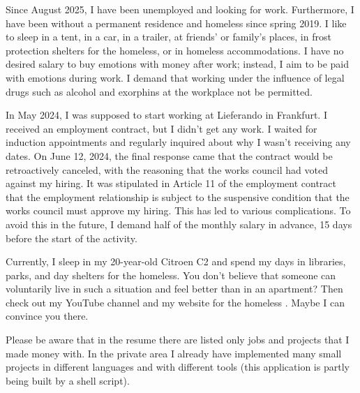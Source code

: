 \documentclass[fromphone,parskip=half]{scrlttr2}%
\newcommand\versionLanguageStart{}
\newcommand\versionLanguageEnd{}
\begin{document}
	\begin{letter}%
	{
		\addressReceiver
	}
		\opening{\joinList{\dear}{\genderReceiver}{\surnameReceiver}{,}}
\versionLanguageStart%
		Since August 2025, I have been unemployed and looking for work.
		Furthermore, I have been without a permanent residence and homeless since spring 2019.
		I like to sleep in a tent, in a car, in a trailer, at friends' or family's places, in frost protection shelters for the homeless, or in homeless accommodations.
		I have no desired salary to buy emotions with money after work; instead, I aim to be paid with emotions during work.
		I demand that working under the influence of legal drugs such as alcohol and exorphins at the workplace not be permitted.
\versionLanguageEnd

\versionLanguageStart%
		In May 2024, I was supposed to start working at Lieferando in Frankfurt.
		I received an employment contract, but I didn't get any work.
		I waited for induction appointments and regularly inquired about why I wasn't receiving any dates.
		On June 12, 2024, the final response came that the contract would be retroactively canceled, with the reasoning that the works council had voted against my hiring.
		It was stipulated in Article 11 of the employment contract that the employment relationship is subject to the suspensive condition that the works council must approve my hiring.
		This has led to various complications.
		To avoid this in the future, I demand half of the monthly salary in advance, 15 days before the start of the activity.
\versionLanguageEnd

\versionLanguageStart%
		Currently, I sleep in my 20-year-old Citroen C2 and spend my days in libraries, parks, and day shelters for the homeless.
		You don't believe that someone can voluntarily live in such a situation and feel better than in an apartment?
		Then check out my YouTube channel  and my website for the homeless .
		Maybe I can convince you there.
\versionLanguageEnd
		
		
\versionLanguageStart%
		Please be aware that in the resume there are listed only jobs and projects that I made money with.
		In the private area I already have implemented many small projects in different languages and with different tools (this application is partly being built by a shell script).
\versionLanguageEnd


\end{letter}
\end{document}
